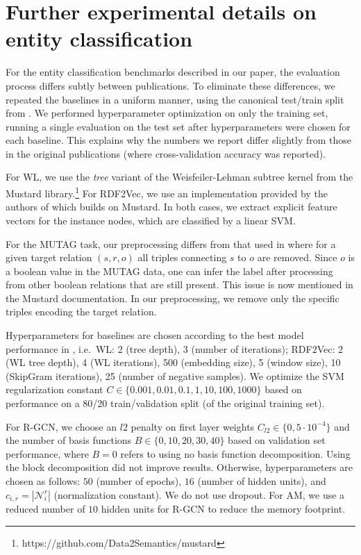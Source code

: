 \section*{Further experimental details on entity classification}
\vspace{2em}

For the entity classification benchmarks described in our paper, the evaluation process differs subtly between publications. To eliminate these differences, we repeated the baselines in a uniform manner, using the canonical test/train split from \cite{ristoski2016collection}. We performed hyperparameter optimization on only the training set, running a single evaluation on the test set after hyperparameters were chosen for each baseline. This explains why the numbers we report differ slightly from those in the original publications (where cross-validation accuracy was reported).

For WL, we use the \textit{tree} variant of the Weisfeiler-Lehman subtree kernel from the Mustard library.\footnote{https://github.com/Data2Semantics/mustard}
For RDF2Vec, we use an implementation provided by the authors of \cite{ristoski2016rdf2vec} which builds on Mustard. In both cases, we extract explicit feature vectors for the instance nodes, which are classified by a linear SVM.

For the MUTAG task, our preprocessing differs from that used in \cite{de2015substructure,ristoski2016rdf2vec} where for a given target relation $(s, r, o)$ all triples connecting $s$ to $o$ are removed. Since $o$ is a boolean value in the MUTAG data, one can infer the label after processing from other boolean relations that are still present. This issue is now mentioned in the Mustard documentation. In our preprocessing, we remove only the specific triples encoding the target relation.

Hyperparameters for baselines are chosen according to the best model performance in \cite{ristoski2016rdf2vec}, i.e.~WL: 2 (tree depth), 3 (number of iterations); RDF2Vec: 2 (WL tree depth), 4 (WL iterations), 500 (embedding size), 5 (window size), 10 (SkipGram iterations), 25 (number of negative samples). We optimize the SVM regularization constant $C\in\{0.001, 0.01, 0.1, 1, 10, 100, 1000\}$ based on performance on a 80/20 train/validation split (of the original training set).

For R-GCN, we choose an $l2$ penalty on first layer weights $C_{l2}\in\{0, 5\cdot10^{-4}\}$ and the number of basis functions $B\in\{0, 10, 20, 30, 40\}$ based on validation set performance, where $B=0$ refers to using no basis function decomposition. Using the block decomposition did not improve results. Otherwise, hyperparameters are chosen as follows: $50$ (number of epochs), $16$ (number of hidden units), and $c_{i,r}=|\mathcal{N}^r_i|$ (normalization constant). We do not use dropout. For AM, we use a reduced number of $10$ hidden units for R-GCN to reduce the memory footprint.

